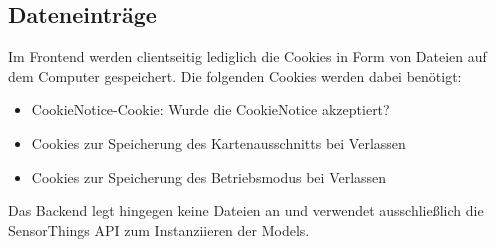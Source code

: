 \subsection{Dateneinträge}
Im Frontend werden clientseitig lediglich die \glspl{Cookie} in Form von Dateien auf dem Computer gespeichert.
Die folgenden Cookies werden dabei benötigt:
\begin{itemize}
    \item \gls{CookieNotice}-\gls{Cookie}: Wurde die \gls{CookieNotice} akzeptiert?
    \item \glspl{Cookie} zur Speicherung des Kartenausschnitts bei Verlassen
    \item \glspl{Cookie} zur Speicherung des Betriebsmodus bei Verlassen
\end{itemize}
Das Backend legt hingegen keine Dateien an und verwendet ausschließlich die \gls{SensorThings API} zum Instanziieren der Models.
